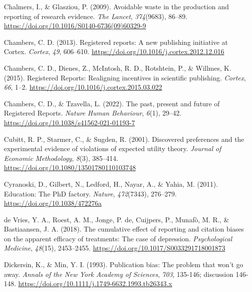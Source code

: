\documentclass[
  ,man,mask,floatsintext]{apa6}
\newlength{\cslhangindent}
\newlength{\cslentryspacingunit} %
\newenvironment{CSLReferences}[2] %
 {%
  \setlength{\parindent}{0pt}
  \ifodd #1
  \let\oldpar\par
  \def\par{\hangindent=\cslhangindent\oldpar}
  \fi
  \setlength{\parskip}{#2\cslentryspacingunit}
 }%
 {}
\begin{document}
\begin{CSLReferences}{1}{0}
\leavevmode{}%
Chalmers, I., \& Glasziou, P. (2009). Avoidable waste in the production and reporting of research evidence. \emph{The Lancet}, \emph{374}(9683), 86--89. \url{https://doi.org/10.1016/S0140-6736(09)60329-9}

\leavevmode{}%
Chambers, C. D. (2013). Registered reports: {A} new publishing initiative at {Cortex}. \emph{Cortex}, \emph{49}, 606--610. \url{https://doi.org/10.1016/j.cortex.2012.12.016}

\leavevmode{}%
Chambers, C. D., Dienes, Z., McIntosh, R. D., Rotshtein, P., \& Willmes, K. (2015). Registered {Reports}: {Realigning} incentives in scientific publishing. \emph{Cortex}, \emph{66}, 1--2. \url{https://doi.org/10.1016/j.cortex.2015.03.022}

\leavevmode{}%
Chambers, C. D., \& Tzavella, L. (2022). The past, present and future of {Registered Reports}. \emph{Nature Human Behaviour}, \emph{6}(1), 29--42. \url{https://doi.org/10.1038/s41562-021-01193-7}

\leavevmode{}%
Cubitt, R. P., Starmer, C., \& Sugden, R. (2001). Discovered preferences and the experimental evidence of violations of expected utility theory. \emph{Journal of Economic Methodology}, \emph{8}(3), 385--414. \url{https://doi.org/10.1080/13501780110103748}

\leavevmode{}%
Cyranoski, D., Gilbert, N., Ledford, H., Nayar, A., \& Yahia, M. (2011). Education: {The PhD} factory. \emph{Nature}, \emph{472}(7343), 276--279. \url{https://doi.org/10.1038/472276a}

\leavevmode{}%
de Vries, Y. A., Roest, A. M., Jonge, P. de, Cuijpers, P., Munafò, M. R., \& Bastiaansen, J. A. (2018). The cumulative effect of reporting and citation biases on the apparent efficacy of treatments: The case of depression. \emph{Psychological Medicine}, \emph{48}(15), 2453--2455. \url{https://doi.org/10.1017/S0033291718001873}

\leavevmode{}%
Dickersin, K., \& Min, Y. I. (1993). Publication bias: The problem that won't go away. \emph{Annals of the New York Academy of Sciences}, \emph{703}, 135-146; discussion 146-148. \url{https://doi.org/10.1111/j.1749-6632.1993.tb26343.x}


\end{CSLReferences}
\end{document}
